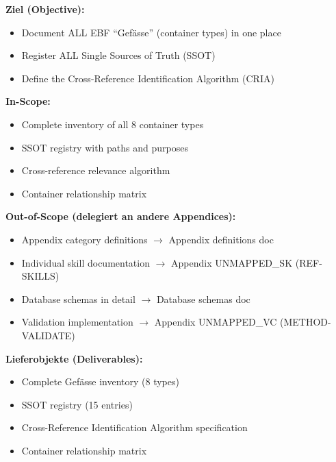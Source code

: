 
\begin{tcolorbox}[
    colback=orange!5!white,
    colframe=orange!75!black,
    title={\textbf{Appendix Scope: Ziel / In-Scope / Out-of-Scope / Lieferobjekte}},
    fonttitle=\bfseries
]

\textbf{Ziel (Objective):}
\begin{itemize}[nosep]
    \item Document ALL EBF ``Gefässe'' (container types) in one place
    \item Register ALL Single Sources of Truth (SSOT)
    \item Define the Cross-Reference Identification Algorithm (CRIA)
\end{itemize}

\textbf{In-Scope:}
\begin{itemize}[nosep]
    \item Complete inventory of all 8 container types
    \item SSOT registry with paths and purposes
    \item Cross-reference relevance algorithm
    \item Container relationship matrix
\end{itemize}

\textbf{Out-of-Scope (delegiert an andere Appendices):}
\begin{itemize}[nosep]
    \item Appendix category definitions $\rightarrow$ Appendix definitions doc
    \item Individual skill documentation $\rightarrow$ Appendix UNMAPPED_SK (REF-SKILLS)
    \item Database schemas in detail $\rightarrow$ Database schemas doc
    \item Validation implementation $\rightarrow$ Appendix UNMAPPED_VC (METHOD-VALIDATE)
\end{itemize}

\textbf{Lieferobjekte (Deliverables):}
\begin{itemize}[nosep]
    \item Complete Gefässe inventory (8 types)
    \item SSOT registry (15 entries)
    \item Cross-Reference Identification Algorithm specification
    \item Container relationship matrix
\end{itemize}

\end{tcolorbox}


